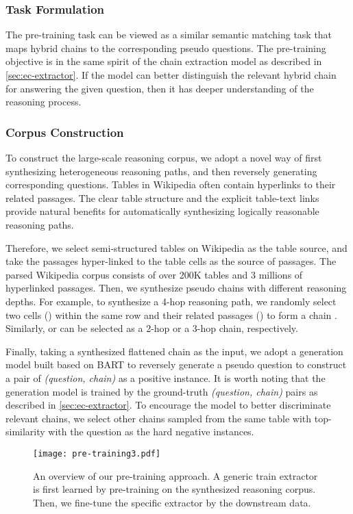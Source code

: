 \documentclass[11pt]{article}
\begin{document}
	\subsubsection{Task Formulation}
	The pre-training task can be viewed as a similar semantic matching task that maps hybrid chains to the corresponding pseudo questions. 
	The pre-training objective is in the same spirit of the chain extraction model as described in \cref{sec:ec-extractor}.
	If the model can better distinguish the relevant hybrid chain for answering the given question, then it has deeper understanding of the reasoning process.
	\subsubsection{Corpus Construction}
	
	To construct the large-scale reasoning corpus, we adopt a novel way of first synthesizing heterogeneous reasoning paths, and then reversely generating corresponding questions. 
	Tables in Wikipedia often contain hyperlinks to their related passages. 
	The clear table structure and the explicit table-text links provide natural benefits for automatically synthesizing logically reasonable reasoning paths. 
	
	Therefore, we select semi-structured tables on Wikipedia as the table source, and take the passages hyper-linked to the table cells as the source of passages. 
	The parsed Wikipedia corpus consists of over 200K tables and 3 millions of hyperlinked passages.
	Then, we synthesize pseudo chains with different reasoning depths. 
	For example, to synthesize a 4-hop reasoning path, we randomly select two cells () within the same row and their related passages () to form a chain . Similarly,  or  can be selected as a 2-hop or a 3-hop chain, respectively. 
	
	Finally, taking a synthesized flattened chain as the input, we adopt a generation model built based on BART \cite{lewis2019bart} to reversely generate a pseudo question to construct a pair of \textit{(question,  chain)} as a positive instance. 
	It is worth noting that the generation model is trained by the ground-truth \textit{(question,  chain)} pairs as described in \cref{sec:ec-extractor}. 
	To encourage the model to better discriminate relevant chains, we select other chains sampled from the same table with top- similarity with the question as the hard negative instances. 
	
	
\begin{figure}[t]
		\centering
		\texttt{[image: pre-training3.pdf]}
		\caption{An overview of our pre-training approach. A generic train extractor is first learned by pre-training on the synthesized reasoning corpus. Then, we fine-tune the specific extractor by the downstream data.}
\label{fig:pretraining}
	\end{figure}
\iffalse
\end{document}
